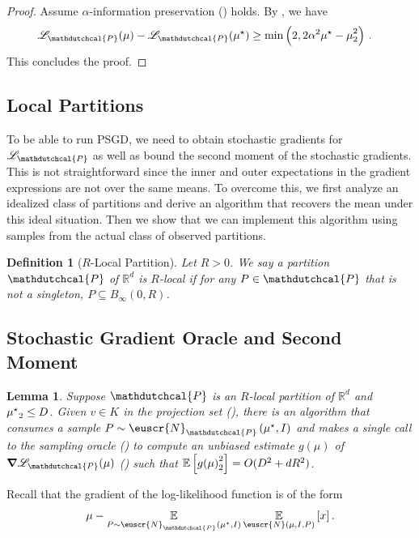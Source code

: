 \documentclass[11pt,letterpaper]{article}
\newcommand{\sset}{\subseteq}
\theoremstyle{plain}
\newtheorem{lemma}[theorem]{Lemma}
\newtheorem{definition}{Definition}
\theoremstyle{definition}
\theoremstyle{remark}
\newcommand{\inparen}[1]{\ensuremath{\left(#1\right)}}
\newcommand{\insquare}[1]{\ensuremath{\left[#1\right]}}
\let\norm\relax
\newcommand{\norm}[1]{\ensuremath{\left\lVert #1 \right\rVert}}
\newcommand{\R}{\mathbb{R}}
\newcommand{\E}{\operatornamewithlimits{\mathbb{E}}}
\newcommand{\Ex}{\E}
\newcommand{\customcal}[1]{\euscr{#1}}
\newcommand{\cN}{\customcal{N}}
\newcommand{\negLL}{\ensuremath{\mathscr{L}}}
\newcommand{\hypo}[1]{\mathdutchcal{#1}}
\newcommand{\hyP}{\hypo{P}}
\newcommand{\coarseNormal}[3]{\cN_{#3}\inparen{#1,#2}}
\newcommand{\truncatedNormal}[3]{\cN\inparen{#1,#2,#3}}
\newcommand{\muStar}{{\mu^\star}}
\begin{document}
{{{\begin{proof}
    Assume $\alpha$-information preservation () holds.
    By ,
    we have
    \begin{align*}
        \negLL_\hyP(\mu) - \negLL_\hyP(\muStar)
        &\geq \min\inparen{2, 2\alpha^2\norm{\muStar-\mu}_2^2}\,.
    \end{align*}
This concludes the proof.
\end{proof}

\subsection{Local Partitions}
\label{sec:localPartitions}
To be able to run PSGD, 
we need to obtain stochastic gradients for $\negLL_\hyP$
as well as bound the second moment of the stochastic gradients.
This is not straightforward since the inner and outer expectations in the gradient expressions
are not over the same means.
To overcome this, we first analyze an idealized class of partitions and derive an algorithm that recovers the mean
under this ideal situation.
Then we show that we can implement this algorithm using samples from the actual class of observed partitions.


\begin{definition}[$R$-Local Partition]\label{def:local partition}
    Let $R > 0$.
    We say a partition $\hyP$ of $\R^d$ is $R$-local if for any $P\in \hyP$ that is not a singleton,
    $P\sset B_\infty(0, R)$.
\end{definition}



\subsection{Stochastic Gradient Oracle and Second Moment} 
    \label{sec:SGD-local}\begin{lemma}\label{lem:convexPartitionGradientOracle}
        Suppose $\hyP$ is an $R$-local partition of $\R^d$ and $\norm{\muStar}_2\leq D$.
        Given $v\in K$ in the projection set (),
        there is an algorithm that consumes a sample $P\sim \coarseNormal{\muStar}{I}{\hyP}$
        and makes a single call to the sampling oracle ()
        to compute an unbiased estimate $g(\mu)$ of $\grad \negLL_\hyP(\mu)$ ()
        such that $\E\insquare{\norm{g(\mu)}_2^2}= O(D^2 + dR^2)$.
    \end{lemma}
    Recall that the gradient of the log-likelihood function is of the form
    \[ 
        \mu
        -
        \Ex_{P\sim \coarseNormal{\muStar}{I}{\hyP}}
        {
            \Ex_{\truncatedNormal{\mu}{I}{P}}\insquare{
                x
            }
        }\,.
    \] 

}}}
\end{document}
